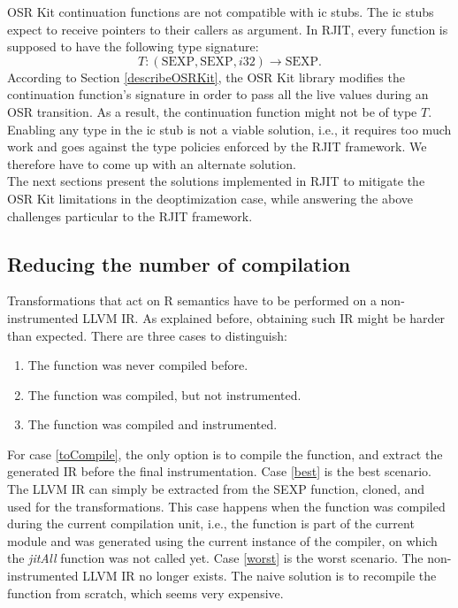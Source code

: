OSR Kit continuation functions are not compatible with ic stubs.
The ic stubs expect to receive pointers to their callers as argument.
In RJIT, every function is supposed to have the following type signature:
$$T: (\text{SEXP}, \text{SEXP}, i32) \rightarrow \text{SEXP}.$$
According to Section \ref{describeOSRKit}, the OSR Kit\cite{OSRKit} library modifies the continuation function's signature in order to pass all the live values during an OSR transition.
As a result, the continuation function might not be of type $T$.
Enabling any type in the ic stub is not a viable solution, i.e., it requires too much work and goes against the type policies enforced by the RJIT framework. 
We therefore have to come up with an alternate solution.\\

The next sections present the solutions implemented in RJIT to mitigate the OSR Kit limitations in the deoptimization case, while answering the above challenges particular to the RJIT framework.\\

\subsection{Reducing the number of compilation}

Transformations that act on R semantics have to be performed on a non-instrumented LLVM IR.
As explained before, obtaining such IR might be harder than expected. 
There are three cases to distinguish:
\begin{enumerate}
    \item The function was never compiled before.\label{toCompile}
    \item The function was compiled, but not instrumented.\label{best} 
    \item The function was compiled and instrumented.\label{worst}
\end{enumerate}

For case \ref{toCompile}, the only option is to compile the function, and extract the generated IR before the final instrumentation.
Case \ref{best} is the best scenario.
The LLVM IR can simply be extracted from the SEXP function, cloned, and used for the transformations.
This case happens when the function was compiled during the current compilation unit, i.e., the function is part of the current module and was generated using the current instance of the compiler, on which the \textit{jitAll} function was not called yet.
Case \ref{worst} is the worst scenario.
The non-instrumented LLVM IR no longer exists.
The naive solution is to recompile the function from scratch, which seems very expensive.\\

